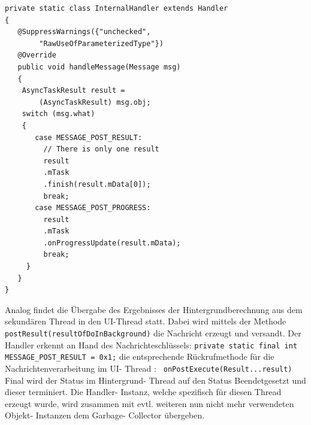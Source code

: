 \documentclass[12pt,oneside,a4paper,bibtotoc,liststotoc]{scrreprt}
\begin{document}
\begin{lstlisting}
private static class InternalHandler extends Handler 
{
   @SuppressWarnings({"unchecked", 
   		"RawUseOfParameterizedType"})
   @Override
   public void handleMessage(Message msg) 
   {
   	AsyncTaskResult result = 
   		(AsyncTaskResult) msg.obj;
   	switch (msg.what) 
   	{
   	   case MESSAGE_POST_RESULT:
   	     // There is only one result
   	     result
   	     .mTask
   	     .finish(result.mData[0]);
   	     break;
   	   case MESSAGE_POST_PROGRESS:
   	     result
   	     .mTask
   	     .onProgressUpdate(result.mData);
   	     break;
     }
   }
}
\end{lstlisting}
Analog findet die Übergabe des Ergebnisses der Hintergrundberechnung aus dem sekundären Thread in den UI-Thread statt. Dabei wird mittels der Methode \texttt{postResult(resultOfDoInBackground)} die Nachricht erzeugt und versandt. Der Handler erkennt an Hand des Nachrichteschlüssels:\newline
\texttt{private static final int MESSAGE\_POST\_RESULT = 0x1;}\newline
die entsprechende Rückrufmethode für die Nachrichtenverarbeitung im UI- Thread :\newline
\texttt{\newline
onPostExecute(Result...result)\newline
}\newline
Final wird der Status im Hintergrund- Thread auf den Status \glqq Beendet\grqq gesetzt und dieser terminiert. Die Handler- Instanz, welche spezifisch für diesen Thread erzeugt wurde, wird zusammen mit evtl. weiteren nun nicht mehr verwendeten Objekt- Instanzen dem Garbage- Collector übergeben.
\end{document}
